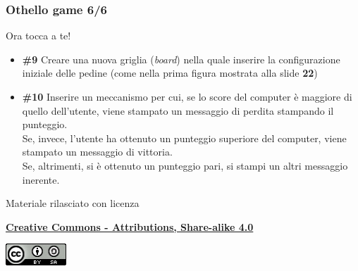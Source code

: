 \documentclass{beamer}
\begin{document}
\begin{frame}[fragile]
\frametitle{Othello game 6/6}
\begin{block}{Ora tocca a te!}
	\begin{itemize}
		\item \textbf{\#9} Creare una nuova griglia (\textit{board}) nella quale inserire la configurazione iniziale delle pedine (come nella prima figura mostrata alla slide \textbf{22})
		\item \textbf{\#10} Inserire un meccanismo per cui, se lo score del computer è maggiore di quello dell'utente, viene stampato un messaggio di perdita stampando il punteggio.\\
		Se, invece, l'utente ha ottenuto un punteggio superiore del computer, viene stampato un messaggio di vittoria.\\
		Se, altrimenti, si è ottenuto un punteggio pari, si stampi un altri messaggio inerente.
	\end{itemize}
\end{block}
\end{frame}

\begin{frame}

\begin{center}
	\bigskip
	Materiale rilasciato con licenza
	
	\textbf{\href{http://creativecommons.org/licenses/by-sa/4.0/}{Creative Commons - Attributions, Share-alike 4.0}}
	
	\medskip
	\includegraphics[height=0.8cm]{images/cc.jpeg}
\end{center}

\end{frame}	
\end{document}
